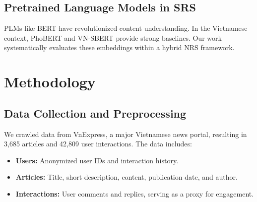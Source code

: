 \documentclass[11pt]{article}
\begin{document}
\subsection{Pretrained Language Models in SRS}
PLMs like BERT \citet{devlin2018bert} have revolutionized content understanding. In the Vietnamese context, PhoBERT and VN-SBERT \citet{reimers2019sentence} provide strong baselines. Our work systematically evaluates these embeddings within a hybrid NRS framework.

\section{Methodology}

\subsection{Data Collection and Preprocessing}
We crawled data from VnExpress, a major Vietnamese news portal, resulting in 3,685 articles and 42,809 user interactions. The data includes:
\begin{itemize}
    \item \textbf{Users:} Anonymized user IDs and interaction history.
    \item \textbf{Articles:} Title, short description, content, publication date, and author.
    \item \textbf{Interactions:} User comments and replies, serving as a proxy for engagement.
\end{itemize}
\end{document}
